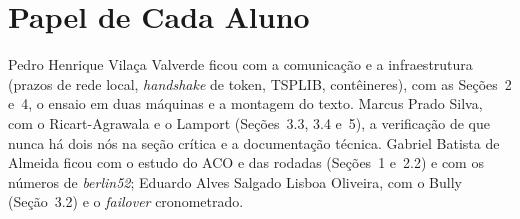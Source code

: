 \section{Papel de Cada Aluno}

Pedro Henrique Vilaça Valverde ficou com a comunicação e a infraestrutura (prazos de rede local,
\textit{handshake} de token, TSPLIB, contêineres), com as Seções~2 e~4, o ensaio em duas máquinas e
a montagem do texto. Marcus Prado Silva, com o Ricart-Agrawala e o Lamport (Seções~3.3, 3.4 e~5), a
verificação de que nunca há dois nós na seção crítica e a documentação técnica. Gabriel Batista de
Almeida ficou com o estudo do ACO e das rodadas (Seções~1 e~2.2) e com os números de
\textit{berlin52}; Eduardo Alves Salgado Lisboa Oliveira, com o Bully (Seção~3.2) e o
\textit{failover} cronometrado.
